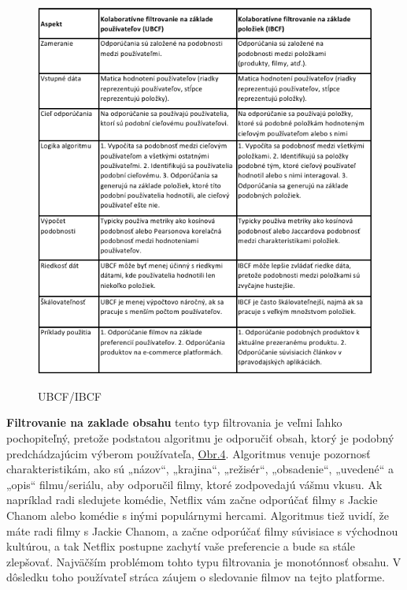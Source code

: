 \documentclass[10pt,slovak,a4paper]{article}
\begin{document}
\begin{figure}[H]
  \centering
  \includegraphics[width=1\textwidth]{Images_tables/table_filtering.png} 
  \label{U:I}
  \caption{UBCF/IBCF}
\end{figure}

\textbf{Filtrovanie na zaklade obsahu} tento typ filtrovania je veľmi ľahko pochopiteľný, pretože podstatou algoritmu je odporučiť obsah, ktorý je podobný predchádzajúcim výberom používateľa, \hyperref[Types:of:filtering]{Obr.4}. Algoritmus venuje pozornosť charakteristikám, ako sú „názov“, „krajina“, „režisér“, „obsadenie“, „uvedené“ a „opis“ filmu/seriálu, aby odporučil filmy, ktoré zodpovedajú vášmu vkusu.\cite{Fil:obsah} Ak napríklad radi sledujete komédie, Netflix vám začne odporúčať filmy s Jackie Chanom alebo komédie s inými populárnymi hercami. Algoritmus tiež uvidí, že máte radi filmy s Jackie Chanom, a začne odporúčať filmy súvisiace s východnou kultúrou, a tak Netflix postupne zachytí vaše preferencie a bude sa stále zlepšovať. Najväčším problémom tohto typu filtrovania je monotónnosť obsahu. V dôsledku toho používateľ stráca záujem o sledovanie filmov na tejto platforme.\cite{Fil:alg:obsah}
\end{document}
